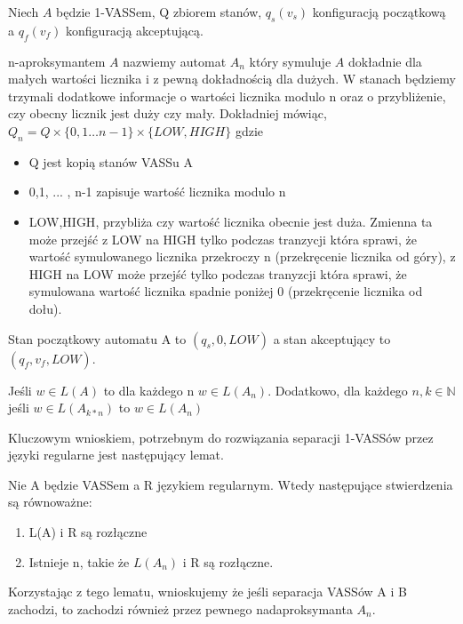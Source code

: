     \begin{definition}
        Niech $A$ będzie 1-VASSem, Q zbiorem stanów, $q_s(v_s)$ konfiguracją początkową a $q_f(v_f)$ konfiguracją akceptującą.


        n-aproksymantem $A$ nazwiemy automat $A_n$ który symuluje $A$ dokładnie dla małych wartości licznika
        i z pewną dokładnością dla dużych.
        W stanach będziemy trzymali dodatkowe informacje o wartości licznika modulo n oraz o przybliżenie,
        czy obecny licznik jest duży czy mały.
        Dokładniej mówiąc, $Q_n = Q \times \{0,1 \dots n-1\} \times \{LOW,HIGH\}$ gdzie
        \begin{itemize}
            \item Q jest kopią stanów VASSu A
            \item  {0,1, ... , n-1} zapisuje wartość licznika modulo n
            \item   {LOW,HIGH}, przybliża czy wartość licznika obecnie jest duża. Zmienna ta może przejść z LOW na HIGH
            tylko podczas tranzycji która sprawi, że wartość symulowanego licznika przekroczy n  (przekręcenie licznika od góry), z HIGH
            na LOW może przejść tylko podczas tranyzcji która sprawi, że symulowana wartość licznika spadnie poniżej 0 (przekręcenie licznika od dołu).
        \end{itemize}
        Stan początkowy automatu A to $(q_s,0,LOW)$ a stan akceptujący to $(q_f,v_f,LOW)$.

    \end{definition}
    Jeśli $w \in L(A)$ to dla każdego n $w \in L(A_n)$.
    Dodatkowo, dla każdego $n,k \in \mathbb{N}$ jeśli $w \in L(A_{k*n})$ to $w \in L(A_n)$

    Kluczowym wnioskiem, potrzebnym do rozwiązania separacji 1-VASSów przez języki regularne jest następujący lemat.
    \begin{lemma}
        \label{aproximants}
        Nie A będzie VASSem a R językiem regularnym.
        Wtedy następujące stwierdzenia są równoważne:
        \begin{enumerate}
            \item L(A) i R są rozłączne
            \item Istnieje n, takie że $L(A_n)$ i R są rozłączne.
        \end{enumerate}
    \end{lemma}

    Korzystając z tego lematu, wnioskujemy że jeśli separacja VASSów A i B zachodzi, to zachodzi również przez
    pewnego nadaproksymanta $A_n$.

